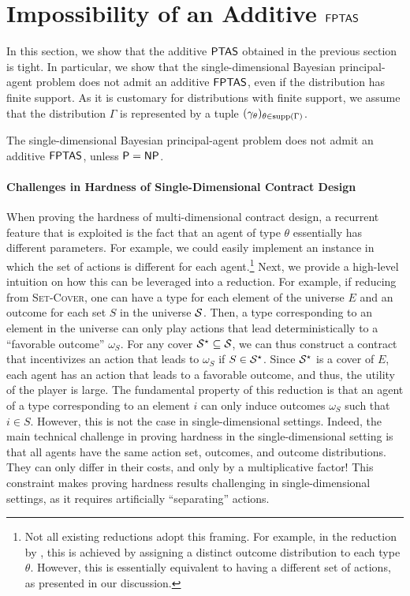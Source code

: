 \section{Impossibility of an Additive $\textsf{FPTAS}$}\label{sec:hardness}

In this section, we show that the additive $\textsf{PTAS}$ obtained in the previous section is tight. In particular, we show that the single-dimensional Bayesian principal-agent problem does not admit an additive $\textsf{FPTAS}$, even if the distribution has finite support. As it is customary for distributions with finite support, we assume that the distribution $\Gamma$ is represented by a tuple $(\gamma_\theta)_{\theta \in \textnormal{supp}(\Gamma)}$.

\begin{theorem}\label{thm:reduction}
The single-dimensional Bayesian principal-agent problem does not admit an additive $\textsf{FPTAS}$, unless $\textsf{P}=\textsf{NP}$.
\end{theorem}

\paragraph{Challenges in Hardness of Single-Dimensional Contract Design}

When proving the hardness of multi-dimensional contract design, a recurrent feature that is exploited is the fact that an agent of type $\theta$ essentially has different parameters. For example, we could easily implement an instance in which the set of actions is different for each agent.\footnote{
Not all existing reductions adopt this framing. For example, in the reduction by \citet{guruganesh2021contracts}, this is achieved by assigning a distinct outcome distribution to each type $\theta$. However, this is essentially equivalent to having a different set of actions, as presented in our discussion.}
%
Next, we provide a high-level intuition on how this can be leveraged into a reduction. For example, if reducing from \textsc{Set-Cover}, one can have a type for each element of the universe $E$ and an outcome for each set $S$ in the universe $\mathcal{S}$. Then, a type corresponding to an element in the universe can only play actions that lead deterministically to a ``favorable outcome'' $\omega_S$. For any cover $\mathcal{S}^\star\subseteq\mathcal{S}$, we can thus construct a contract that incentivizes an action that leads to $\omega_S$ if $S\in\mathcal{S}^\star$. Since $\mathcal{S}^\star$ is a cover of $E$, each agent has an action that leads to a favorable outcome, and thus, the utility of the player is large. The fundamental property of this reduction is that an agent of a type corresponding to an element $i$ can only induce outcomes $\omega_S$ such that $i\in S$. However, this is not the case in single-dimensional settings.%
Indeed, the main technical challenge in proving hardness in the single-dimensional setting is that all agents have the same action set, outcomes, and outcome distributions. They can only differ in their costs, and only by a multiplicative factor! This constraint makes proving hardness results challenging in single-dimensional settings, as it requires artificially ``separating'' actions.



